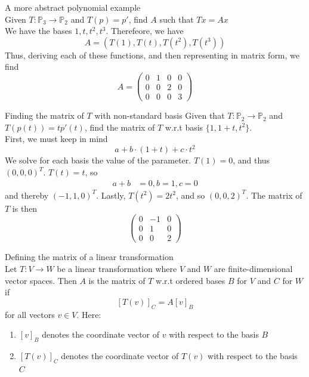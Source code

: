 \documentclass[journal, letterpaper]{IEEEtran}
\begin{document}
    \begin{myboxg}{A more abstract polynomial example} \\ 
        Given $T : \mathbb{P}_3 \to \mathbb{P}_2$ and $T(p) = p'$, find $A$ such that $Tx = Ax$
        \newline \\ 
        We have the bases $1, t, t^2, t^3$. Therefeore, we have
        $$ A = (T(1), T(t), T(t^2), T(t^3))$$
        Thus, deriving each of these functions, and then representing in matrix form, we find
        $$ A = \begin{pmatrix}
            0 & 1 & 0 & 0 \\ 0 & 0 & 2 & 0 \\ 0 & 0 & 0 & 3
        \end{pmatrix}$$
    \end{myboxg}
    \begin{myboxg}{Finding the matrix of $T$ with non-standard basis}
        Given that $T: \mathbb{P}_2 \to \mathbb{P}_2$ and $T(p(t)) = tp'(t)$, find the matrix of $T$ w.r.t basis $\{1, 1 + t, t^2 \}$.
        \newline \\
        First, we must keep in mind
        $$ a + b \cdot (1 + t) + c \cdot t^2$$
        We solve for each basis the value of the parameter.
        $ T(1) = 0$, and thus $(0, 0, 0)^T$. $T(t) = t$, so
        \begin{align*}
            a + b &= 0, b = 1, c = 0
        \end{align*}
        and thereby $(-1, 1, 0)^T$. Lastly, $T(t^2) = 2t^2$, and so $(0, 0, 2)^T$. The matrix of $T$ is then
        $$ \begin{pmatrix}
            0 & -1 & 0 \\ 0 & 1 & 0 \\ 0 & 0 & 2
        \end{pmatrix}$$
    \end{myboxg}
    \begin{mybox}{Defining the matrix of a linear transformation} \\ 
        Let $T : V \to W$ be a linear transformation where $V$ and $W$ are finite-dimensional vector spaces. Then $A$ is the matrix of $T$ w.r.t ordered bases $B$ for $V$ and $C$ for $W$ if
        $$ [T(v)]_C = A[v]_B$$
        for all vectors $v \in V$. Here:
        \begin{enumerate}
            \item $[v]_B$ denotes the coordinate vector of $v$ with respect to the basis $B$
            \item $[T(v)]_C$ denotes the coordinate vector of $T(v)$ with respect to the basis $C$
        \end{enumerate}
    \end{mybox}
\end{document}
